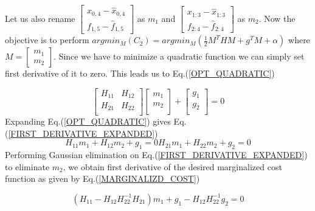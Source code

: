 Let us also rename $\begin{bmatrix} x_{0, 4} - \hat x_{0, 4} \\ f_{1, 5} - \hat f_{1, 5} \end{bmatrix}$ as $m_1$ and $\begin{bmatrix} x_{1:3} - \hat x_{1:3} \\ f_{2:4} - \hat f_{2:4} \end{bmatrix}$ as $m_2$. Now the objective is to perform $argmin_M(C_2) = argmin_M(\frac{1}{2}M^THM + g^TM + \alpha)$ where $M = \begin{bmatrix} m_1 \\ m_2 \end{bmatrix}$. Since we have to minimize a quadratic function we can simply set first derivative of it to zero. This leads us to Eq.(\ref{OPT_QUADRATIC})

\begin{equation}
	\begin{bmatrix} 
				H_{11} & H_{12} \\
				H_{21} & H_{22} \\
	\end{bmatrix}
	\begin{bmatrix} 
				m_{1} \\
				m_{2} \\
	\end{bmatrix} + 
	\begin{bmatrix} 
				g_{1} \\
				g_{2} \\
	\end{bmatrix} = 0
	\label{OPT_QUADRATIC}
\end{equation}
Expanding Eq.(\ref{OPT_QUADRATIC}) gives Eq.(\ref{FIRST_DERIVATIVE_EXPANDED})
\begin{subequations}
	\begin{equation}
		H_{11}m_1 + H_{12}m_2 + g_1 = 0
	\end{equation}
	\begin{equation}
		H_{21}m_1 + H_{22}m_2 + g_2 = 0
	\end{equation}
\label{FIRST_DERIVATIVE_EXPANDED}
\end{subequations}
Performing Gaussian elimination on Eq.(\ref{FIRST_DERIVATIVE_EXPANDED}) to eliminate $m_2$, we obtain first derivative of the desired marginalized cost function as given by Eq.(\ref{MARGINALIZD_COST})

\begin{equation}
	\left(H_{11} - H_{12}H_{22}^{-1}H_{21}\right)m_1 + g_1 - H_{12}H_{22}^{-1}g_2 = 0
\label{MARGINALIZD_COST}
\end{equation}

